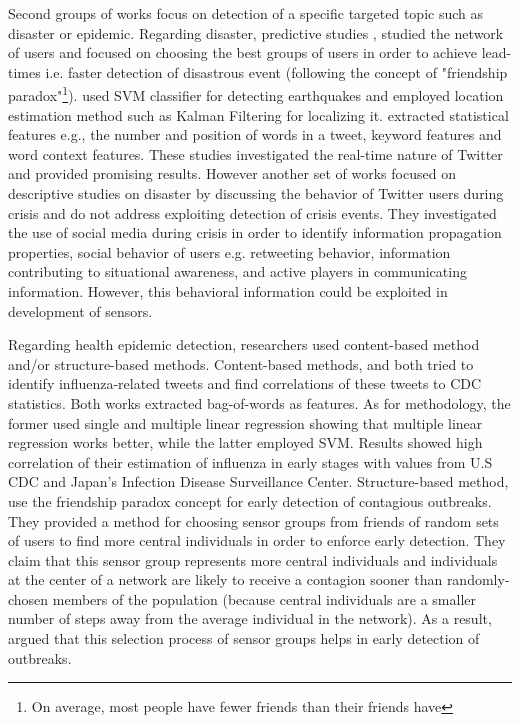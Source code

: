 \documentclass[letterpaper]{article}
\begin{document}
Second groups of works focus on detection of a specific targeted topic such as disaster or epidemic. Regarding disaster, predictive studies \cite{sandy}, studied the network of users and focused on choosing the best groups of users in order to achieve lead-times i.e. faster detection of disastrous event (following the concept of "friendship paradox"\footnote{On average, most people have fewer friends than their friends have}). \cite{sakakiEq2} used SVM classifier for detecting earthquakes and employed location estimation method such as Kalman Filtering for localizing it. \citeauthor{sakakiEq2} extracted statistical features e.g., the number and position of words in a tweet, keyword features and word context features. These studies investigated the real-time nature of Twitter and provided promising results. However another set of works focused on descriptive studies on disaster by discussing the behavior of Twitter users during crisis \cite{vieweg,cheong,starbird} and do not address exploiting detection of crisis events. They investigated the use of social media during crisis in order to identify information propagation properties, social behavior of users e.g. retweeting behavior, information contributing to situational awareness, and active players in communicating information. However, this behavioral information could be exploited in development of sensors.

Regarding health epidemic detection, researchers used content-based method and/or structure-based methods. Content-based methods, \cite{culotta} and \cite{aramaki} both tried to identify influenza-related tweets and find correlations of these tweets to CDC statistics.  Both works extracted bag-of-words as features. As for methodology, the former used single and multiple linear regression showing that multiple linear regression works better, while the latter employed SVM. Results showed high correlation of their estimation of influenza in early stages with values from U.S CDC and Japan's Infection Disease Surveillance Center. Structure-based method, \cite{garcia} use the friendship paradox concept \cite{feld} for early detection of contagious outbreaks. They provided a method for choosing sensor groups from friends of random sets of users to find more central individuals in order to enforce early detection. They claim that this sensor group represents more central individuals and individuals at the center of a network are likely to receive a contagion sooner than randomly-chosen members of the population (because central individuals are a smaller number of steps away from the average individual in the network). As a result, \cite{garcia} argued that this selection process of sensor groups helps in early detection of outbreaks.
\end{document}

